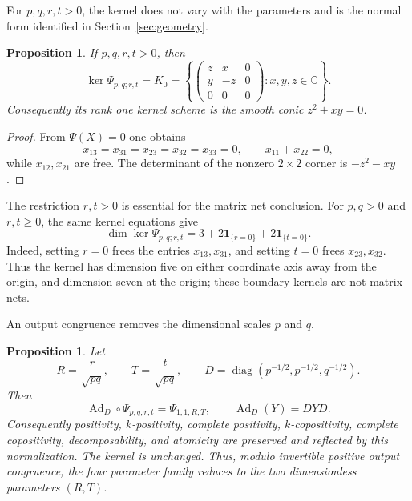 \documentclass[11pt]{amsart}
\newcommand{\chg}[1]{#1}
\newcommand{\Ad}{\operatorname{Ad}}
\theoremstyle{plain}
\newtheorem{proposition}[theorem]{Proposition}
\theoremstyle{definition}
\theoremstyle{remark}
\begin{document}
\chg{For {$p,q,r,t>0$}, the kernel does not vary with the parameters and is the normal form identified in Section~\ref{sec:geometry}.}

\begin{proposition}\label{prop:kernel}
If $p,q,r,t>0$, then
\[
\ker\Psi_{p,q;r,t}=K_0=
\left\{
\begin{pmatrix}
z&x&0\\
y&-z&0\\
0&0&0
\end{pmatrix}:x,y,z\in\mathbb C
\right\}.
\]
Consequently its \chg{rank one} kernel scheme is the smooth conic $z^2+xy=0$.
\end{proposition}

\begin{proof}
From $\Psi(X)=0$ one obtains
\[
x_{13}=x_{31}=x_{23}=x_{32}=x_{33}=0,
\qquad x_{11}+x_{22}=0,
\]
while $x_{12},x_{21}$ are free. The determinant of the nonzero $2\times2$ corner is $-z^2-xy$.
\end{proof}

{
The restriction $r,t>0$ is essential for the matrix net conclusion. For $p,q>0$ and $r,t\ge0$, the same kernel equations give
\[
\dim\ker\Psi_{p,q;r,t}
=3+2\mathbf 1_{\{r=0\}}+2\mathbf 1_{\{t=0\}}.
\]
Indeed, setting $r=0$ frees the entries $x_{13},x_{31}$, and setting $t=0$ frees $x_{23},x_{32}$. Thus the kernel has dimension five on either coordinate axis away from the origin, and dimension seven at the origin; these boundary kernels are not matrix nets.
}

\chg{An output congruence removes the dimensional scales $p$ and $q$.}

\begin{proposition}\label{prop:normalization}
Let
\[
R=\frac r{\sqrt{pq}},\qquad T=\frac t{\sqrt{pq}},\qquad
D=\operatorname{diag}(p^{-1/2},p^{-1/2},q^{-1/2}).
\]
Then
\[
\Ad_D\circ\Psi_{p,q;r,t}=\Psi_{1,1;R,T},
\qquad
\Ad_D(Y)=DYD.
\]
Consequently positivity, $k$-positivity, complete positivity, $k$-copositivity, complete copositivity, decomposability, and atomicity are preserved and reflected by this normalization. The kernel is unchanged. Thus, modulo invertible positive output congruence, the \chg{four parameter} family reduces to the two dimensionless parameters $(R,T)$.
\end{proposition}
\end{document}

